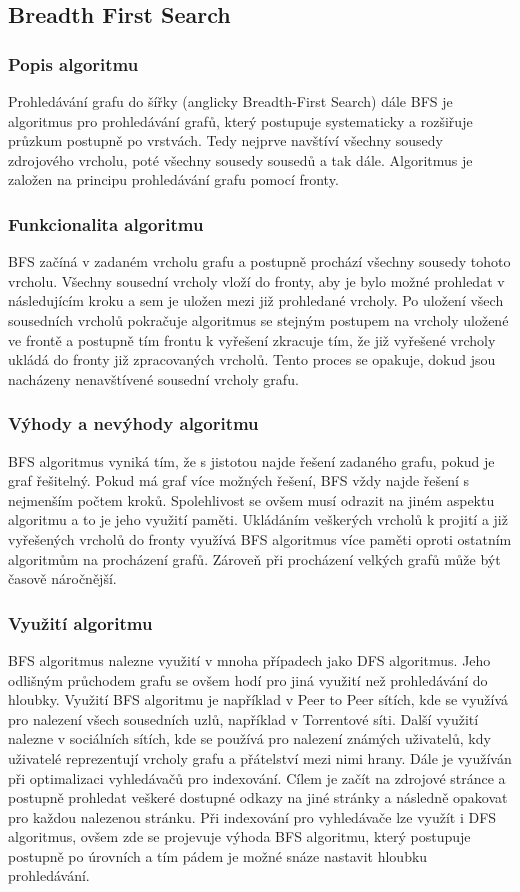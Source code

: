 \documentclass[12pt, titlepage, a4paper]{article}
\begin{document}
\subsection{Breadth First Search}
\subsubsection{Popis algoritmu}
Prohledávání grafu do šířky (anglicky Breadth-First Search) dále BFS je algoritmus 
pro prohledávání grafů, který postupuje systematicky a rozšiřuje průzkum postupně po 
vrstvách. Tedy nejprve navštíví všechny sousedy zdrojového vrcholu, poté všechny sousedy 
sousedů a tak dále. Algoritmus je založen na principu prohledávání grafu pomocí fronty.

\subsubsection{Funkcionalita algoritmu}
BFS začíná v zadaném vrcholu grafu a postupně prochází všechny sousedy tohoto vrcholu. 
Všechny sousední vrcholy vloží do fronty, aby je bylo možné prohledat v následujícím kroku 
a sem je uložen mezi již prohledané vrcholy. Po uložení všech sousedních vrcholů pokračuje 
algoritmus se stejným postupem na vrcholy uložené ve frontě a postupně tím frontu k vyřešení 
zkracuje tím, že již vyřešené vrcholy ukládá do fronty již zpracovaných vrcholů. Tento proces 
se opakuje, dokud jsou nacházeny nenavštívené sousední vrcholy grafu.

\subsubsection{Výhody a nevýhody algoritmu}
BFS algoritmus vyniká tím, že s jistotou najde řešení zadaného grafu, pokud je graf řešitelný.
Pokud má graf více možných řešení, BFS vždy najde řešení s nejmenším počtem kroků. Spolehlivost 
se ovšem musí odrazit na jiném aspektu algoritmu a to je jeho využití paměti. Ukládáním veškerých 
vrcholů k projití a již vyřešených vrcholů do fronty využívá BFS algoritmus více paměti oproti ostatním algoritmům
na procházení grafů. Zároveň při procházení velkých grafů může být časově náročnější.

\subsubsection{Využití algoritmu}
BFS algoritmus nalezne využití v mnoha případech jako DFS algoritmus. Jeho odlišným průchodem grafu se ovšem hodí 
pro jiná využití než prohledávání do hloubky. Využití BFS algoritmu je například v Peer to Peer sítích, kde se 
využívá pro nalezení všech sousedních uzlů, například v Torrentové síti. Další využití nalezne v sociálních sítích,
kde se používá pro nalezení známých uživatelů, kdy uživatelé reprezentují vrcholy grafu a přátelství mezi nimi hrany.
Dále je využíván při optimalizaci vyhledávačů pro indexování. Cílem je začít na zdrojové stránce a postupně prohledat 
veškeré dostupné odkazy na jiné stránky a následně opakovat pro každou nalezenou stránku. Při indexování pro vyhledávače 
lze využít i DFS algoritmus, ovšem zde se projevuje výhoda BFS algoritmu, který postupuje postupně po úrovních a tím pádem 
je možné snáze nastavit hloubku prohledávání.
\end{document}
